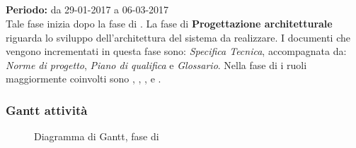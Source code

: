 \subsection{\PA{}}
\textbf{Periodo:} da 29-01-2017 a 06-03-2017 \\
Tale fase inizia dopo la fase di \AD{}. La fase di \textbf{Progettazione architetturale} riguarda lo sviluppo dell'architettura del sistema da realizzare. I documenti che vengono incrementati in questa fase sono: \textit{Specifica Tecnica}, accompagnata da: \textit{Norme di progetto}, \textit{Piano di qualifica} e \textit{Glossario}.
Nella fase di \PA{} i ruoli maggiormente coinvolti sono \Progettista{}, \Responsabile{}, \Amministratore{}, \Analista{} e \Verificatore{}.
\subsubsection{Gantt attività}
\begin{figure}[H]
	\centering
	\caption{Diagramma di Gantt, fase di \PA{}}
\end{figure}

